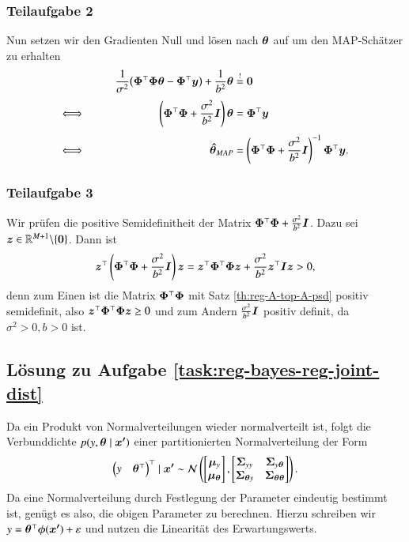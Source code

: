 \subsubsection*{Teilaufgabe 2}

Nun setzen wir den Gradienten Null und lösen nach $\bm{\theta}$ auf um den MAP-Schätzer zu erhalten
\begin{alignat*}{3}
		&&\qquad \frac{1}{\sigma^2} \bigl( \bm{\Phi}^\top \bm{\Phi} \bm{\theta} - \bm{\Phi}^\top \bm{y} \bigr) + \frac{1}{b^2} \bm{\theta}
		&\overset{!}{=} \bm{0}
\\[1mm]
	\Longleftrightarrow
		&&\qquad \left( \bm{\Phi}^\top \bm{\Phi} + \frac{\sigma^2}{b^2} \bm{I} \right) \bm{\theta}
		&= \bm{\Phi}^\top \bm{y}
\\[1mm]
	\Longleftrightarrow
		&&\qquad \bm{\hat{\theta}}_{MAP}
		&= \left( \bm{\Phi}^\top \bm{\Phi} + \frac{\sigma^2}{b^2} \bm{I} \right)^{-1} \bm{\Phi}^\top \bm{y}.
\end{alignat*}

\subsubsection*{Teilaufgabe 3}

Wir prüfen die positive Semidefinitheit der Matrix $\bm{\Phi}^\top \bm{\Phi} + \frac{\sigma^2}{b^2} \bm{I}$. Dazu sei $\bm{z} \in \mathbb{R}^{M+1} \backslash \{ \bm{0} \}$. Dann ist
\begin{equation*}
	\bm{z}^\top \left( \bm{\Phi}^\top \bm{\Phi} + \frac{\sigma^2}{b^2} \bm{I} \right) \bm{z}
		= \bm{z}^\top \bm{\Phi}^\top \bm{\Phi} \bm{z} + \frac{\sigma^2}{b^2} \bm{z}^\top \bm{I} \bm{z}
		> 0,
\end{equation*}
denn zum Einen ist die Matrix $\bm{\Phi}^\top \bm{\Phi}$ mit Satz \ref{th:reg-A-top-A-psd} positiv semidefinit, also $\bm{z}^\top \bm{\Phi}^\top \bm{\Phi} \bm{z} \ge 0$ und zum Andern $\frac{\sigma^2}{b^2} \bm{I}$ positiv definit, da $\sigma^2 > 0, b > 0$ ist.


\subsection*{Lösung zu Aufgabe \ref{task:reg-bayes-reg-joint-dist}}

Da ein Produkt von Normalverteilungen wieder normalverteilt ist, folgt die Verbunddichte $p(y, \bm{\theta} \mid \bm{x'})$ einer partitionierten Normalverteilung der Form
\begin{equation*}
	\begin{pmatrix} y & \bm{\theta}^\top \end{pmatrix}^\top \mid \bm{x'} \sim \mathcal{N}\left(
		\begin{bmatrix} \bm{\mu}_y \\ \bm{\mu}_{\bm{\theta}} \end{bmatrix},
		\begin{bmatrix}
			\bm{\Sigma}_{yy} 		& \bm{\Sigma}_{y \bm{\theta}} 		\\
			\bm{\Sigma}_{\bm{\theta} y} 	& \bm{\Sigma}_{\bm{\theta} \bm{\theta}}
		\end{bmatrix}
	\right).
\end{equation*}
Da eine Normalverteilung durch Festlegung der Parameter eindeutig bestimmt ist, genügt es also, die obigen Parameter zu berechnen. Hierzu schreiben wir $y = \bm{\theta}^\top \bm{\phi}(\bm{x'}) + \varepsilon$ und nutzen die Linearität des Erwartungswerts.

